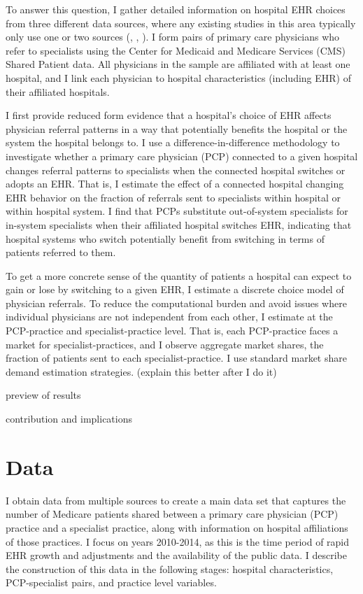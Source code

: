 \documentclass[12pt]{article}
\begin{document}
    To answer this question, I gather detailed information on hospital EHR choices from three different data sources, where any existing studies in this area typically only use one or two sources (\cite{desai2016role}, \cite{lin2021strategic}, \cite{xueeffects}). I form pairs of primary care physicians who refer to specialists using the Center for Medicaid and Medicare Services (CMS) Shared Patient data. All physicians in the sample are affiliated with at least one hospital, and I link each physician to hospital characteristics (including EHR) of their affiliated hospitals.

    I first provide reduced form evidence that a hospital's choice of EHR affects physician referral patterns in a way that potentially benefits the hospital or the system the hospital belongs to. I use a difference-in-difference methodology to investigate whether a primary care physician (PCP) connected to a given hospital changes referral patterns to specialists when the connected hospital switches or adopts an EHR. That is, I estimate the effect of a connected hospital changing EHR behavior on the fraction of referrals sent to specialists within hospital or within hospital system. I find that PCPs substitute out-of-system specialists for in-system specialists when their affiliated hospital switches EHR, indicating that hospital systems who switch potentially benefit from switching in terms of patients referred to them. 

    To get a more concrete sense of the quantity of patients a hospital can expect to gain or lose by switching to a given EHR, I estimate a discrete choice model of physician referrals. To reduce the computational burden and avoid issues where individual physicians are not independent from each other, I estimate at the PCP-practice and specialist-practice level. That is, each PCP-practice faces a market for specialist-practices, and I observe aggregate market shares, the fraction of patients sent to each specialist-practice. I use standard market share demand estimation strategies. (explain this better after I do it) 

    preview of results

    contribution and implications
	


    \section{Data}

    I obtain data from multiple sources to create a main data set that captures the number of Medicare patients shared between a primary care physician (PCP) practice and a specialist practice, along with information on hospital affiliations of those practices. I focus on years 2010-2014, as this is the time period of rapid EHR growth and adjustments and the availability of the public data. I describe the construction of this data in the following stages: hospital characteristics, PCP-specialist pairs, and practice level variables. 
\end{document}
